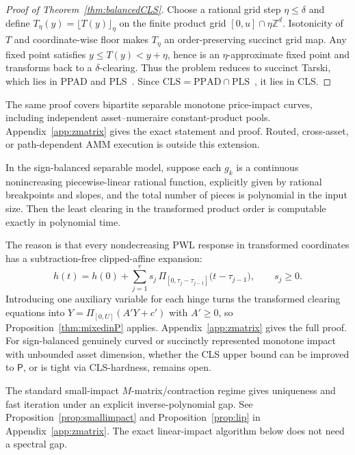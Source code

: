\documentclass{llncs}
\newcommand{\clip}{\Pi}
\begin{document}
\begin{proof}[Proof of Theorem~\ref{thm:balancedCLS}]
Choose a rational grid step \(\eta\le\delta\) and define \(T_\eta(y)=\lfloor T(y)\rfloor_\eta\) on the finite product grid \([0,u]\cap\eta\mathbb Z^d\). Isotonicity of \(T\) and coordinate-wise floor makes \(T_\eta\) an order-preserving succinct grid map. Any fixed point satisfies \(y\le T(y)<y+\eta\), hence is an \(\eta\)-approximate fixed point and transforms back to a \(\delta\)-clearing. Thus the problem reduces to succinct Tarski, which lies in PPAD and PLS~\cite{EtessamiPapadimitriouRubinsteinYannakakis2020}. Since \(\mathrm{CLS}=\mathrm{PPAD}\cap\mathrm{PLS}\)~\cite{FearnleyGoldbergHollenderSavani2021}, it lies in CLS.
\end{proof}

The same proof covers bipartite separable monotone price-impact curves, including independent asset--numeraire constant-product pools. Appendix~\ref{app:zmatrix} gives the exact statement and proof.  Routed, cross-asset, or path-dependent AMM execution is outside this extension.

\begin{proposition}
\label{prop:pwlP}
In the sign-balanced separable model, suppose each \(g_k\) is a continuous nonincreasing piecewise-linear rational function, explicitly given by rational breakpoints and slopes, and the total number of pieces is polynomial in the input size. Then the least clearing in the transformed product order is computable exactly in polynomial time.
\end{proposition}

The reason is that every nondecreasing PWL response in transformed coordinates has a subtraction-free clipped-affine expansion:
\[
   h(t)=h(0)+\sum_{j=1}^r s_j\,
        \clip_{[0,\tau_j-\tau_{j-1}]}\bigl(t-\tau_{j-1}\bigr),
        \qquad s_j\ge0.
\]
Introducing one auxiliary variable for each hinge turns the transformed clearing equations into \(Y=\clip_{[0,U]}(A'Y+c')\) with \(A'\ge0\), so Proposition~\ref{thm:mixedinP} applies. Appendix~\ref{app:zmatrix} gives the full proof.  For sign-balanced genuinely curved or succinctly represented monotone impact with unbounded asset dimension, whether the CLS upper bound can be improved to \(\mathsf P\), or is tight via CLS-hardness, remains open.

The standard small-impact \(M\)-matrix/contraction regime gives uniqueness and fast iteration under an explicit inverse-polynomial gap. See Proposition~\ref{prop:smallimpact} and Proposition~\ref{prop:lip} in Appendix~\ref{app:zmatrix}. The exact linear-impact algorithm below does not need a spectral gap.
\end{document}
